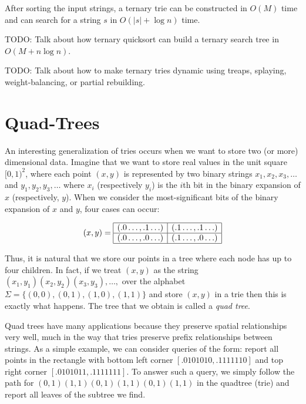 \begin{thm}
After sorting the input strings, a ternary trie can be constructed in
$O(M)$ time and can search for a string $s$ in $O(|s|+\log n)$ time.
\end{thm}

TODO: Talk about how ternary quicksort can build a ternary search tree
in $O(M+n\log n)$.

TODO: Talk about how to make ternary tries dynamic using treaps, splaying, weight-balancing, or partial rebuilding. 

\section{Quad-Trees}

An interesting generalization of tries occurs when we want to store
two (or more) dimensional data.  Imagine that we want to store real
values in the unit square $[0,1)^2$, where each point $(x,y)$ is
represented by two binary strings $x_1,x_2,x_3,\ldots$ and
$y_1,y_2,y_3,\ldots$ where $x_i$ (respectively $y_i$) is the
$i$th bit in the binary expansion of $x$ (respectively, $y$).  When we
consider the most-significant bits of the binary expansion of $x$ and
$y$, four cases can occur:


\[(x,y) = \begin{array}{|c|c|}\hline
(.0\ldots,.1\ldots) & (.1\ldots,.1\ldots) \\ \hline
(.0\ldots,.0\ldots) & (.1\ldots,.0\ldots) \\ \hline
\end{array}
\]

Thus, it is natural that we store our points in a tree where each node
has up to four children.  In fact, if we treat $(x,y)$ as the string
$(x_1,y_1)(x_2,y_2)(x_3,y_3),\ldots,$ over the alphabet
$\Sigma=\{(0,0),(0,1),(1,0),(1,1)\}$ and store $(x,y)$ in a trie then
this is exactly what happens.  The tree that we obtain is called a
\emph{quad tree}.

Quad trees have many applications because they preserve spatial
relationships very well, much in the way that tries preserve prefix
relationships between strings.  As a simple example, we can consider
queries of the form: report all points in the rectangle with bottom
left corner $[.0101010,.1111110]$ and top right corner
$[.0101011,.1111111]$.  To answer such a query, we simply follow the
path for $(0,1)(1,1)(0,1)(1,1)(0,1)(1,1)$ in the quadtree (trie) and
report all leaves of the subtree we find.

